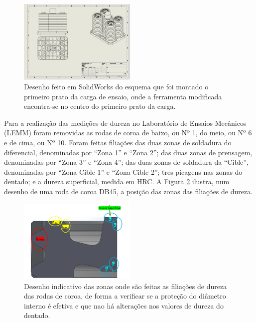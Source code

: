 \begin{figure}[htb!]
    \centering
    \includegraphics[width = 0.5\textwidth]{Figures/Cap3/Desenho_ensaio_simples.png}
    \caption[Desenho do esquema de montagem da ferramenta]%
    {Desenho feito em SolidWorks do esquema que foi montado o primeiro prato da carga de ensaio, onde a ferramenta modificada encontra-se no centro do primeiro prato da carga.}
    \label{fig:esquema_ensaio_simples}
\end{figure}
\newpage
\par
Para a realização das medições de dureza no Laboratório de Ensaios Mecânicos (LEMM) foram removidas as rodas de coroa de baixo, ou Nº 1, do meio, ou Nº 6 e de cima, ou Nº 10. Foram feitas filiações das duas zonas de soldadura do diferencial, denominadas por “Zona 1” e “Zona 2”; das duas zonas de prensagem, denominadas por “Zona 3” e “Zona 4”; das duas zonas de soldadura da “Cible”, denominadas por “Zona Cible 1” e “Zona Cible 2”; tres picagens nas zonas do dentado; e a dureza superficial, medida em HRC. A Figura \ref{fig:zonas_filiacoes_dureza} ilustra, num desenho de uma roda de coroa DB45, a posição das zonas das filiações de dureza.
\begin{figure}[htb!]
    \centering
    \includegraphics[width = 0.5\textwidth]{Figures/Cap3/Zonas_dureza.png}
    \caption[Zonas das filiações de dureza]%
    {Desenho indicativo das zonas onde são feitas as filiações de dureza das rodas de coroa, de forma a verificar se a proteção do diâmetro interno é efetiva e que nao há alterações nos valores de dureza do dentado.}
    \label{fig:zonas_filiacoes_dureza}
\end{figure}
